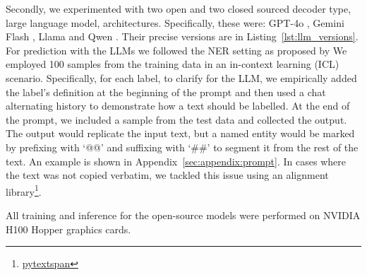 \documentclass[11pt]{article}
\begin{document}

Secondly, we experimented with two open and two closed sourced decoder type, large language model, architectures. Specifically, these were: GPT-4o \citep{openai2024gpt4}, Gemini Flash \citep{geminiteam2024gemini}, Llama \citep{grattafiori2024llama3herdmodels} and Qwen \citep{yang2024qwen2technicalreport}. %
Their precise versions are in Listing~\ref{lst:llm_versions}.
For prediction with the LLMs we followed the NER setting as proposed by \citet{wang2023gptnernamedentityrecognition}
We employed 100 samples from the training data in an in-context learning (ICL) scenario. Specifically, for each label, to clarify for the LLM, we empirically added the label's definition at the beginning of the prompt and then used a chat alternating history to demonstrate how a text should be labelled. At the end of the prompt, we included a sample from the test data and collected the output. The output would replicate the input text, but a named entity would be marked by prefixing with `@@' and suffixing with `\#\#' to segment it from the rest of the text. An example is shown in Appendix~\ref{sec:appendix:prompt}. In cases where the text was not copied verbatim, we tackled this issue using an alignment library\footnote{\href{https://pypi.org/project/pytextspan/}{pytextspan}}.

All training and inference for the open-source models were performed on NVIDIA H100 Hopper graphics cards.
\end{document}
